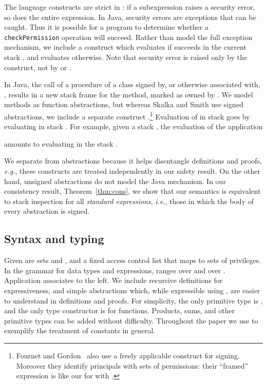 \documentclass[submission,copyright,creativecommons]{eptcs}
\newcommand{\ie}{{\em i.e.}}
\newcommand{\eg}{{\em e.g.}}
\begin{document}
The language constructs are strict in : if a subexpression
raises a security error, so does the entire expression.  In Java, security
errors are exceptions that can be caught.  Thus it is possible for a
program to determine whether a \texttt{checkPermission} operation will
succeed.  Rather than model the full exception mechanism, we
include a construct  which evaluates  if
 succeeds in the current stack , and evaluates 
otherwise.  Note that security error  is raised only by the
 construct, not by  or .

In Java, the call of a procedure of a class signed by, or otherwise
associated with, , results in a new stack frame for the method,
marked as owned by .  We model methods as function abstractions,
but whereas Skalka and Smith use signed abstractions, we include a
separate construct
.\footnote{\label{fn:pfg}Fournet and Gordon~\cite{FournetG03} also use a freely applicable construct for signing.
Moreover they identify principals with sets of permissions: their ``framed'' expression  
is like our  for  with .}  
Evaluation of  in stack  goes by evaluating  in
stack .  For example, given a stack , the
evaluation of the application

amounts to evaluating 
in the stack . 

We separate  from abstractions because it helps disentangle
definitions and proofs, \eg, these constructs are treated
independently in our safety result.  On the other hand, unsigned
abstractions do not model the Java mechanism.  In our consistency
result, Theorem~\ref{thm:cons}, we show that our semantics is
equivalent to stack inspection for all \emph{standard expressions},
\ie, those in which the body of every abstraction is signed.

\subsection{Syntax and typing}
\label{sec:la}

Given are sets  and , and a fixed access control list
 that maps  to sets of privileges.  In the grammar for
data types and expressions,  ranges over  and  over
.  Application associates to the left.  We include recursive
definitions for expressiveness, and simple abstractions 
which, while expressible using , are easier to
understand in definitions and proofs.  For simplicity, the only
primitive type is , and the only type constructor is for
functions.  Products, sums, and other primitive types can be added
without difficulty. Throughout the paper we use  to exemplify the treatment of constants in general.
\end{document}
